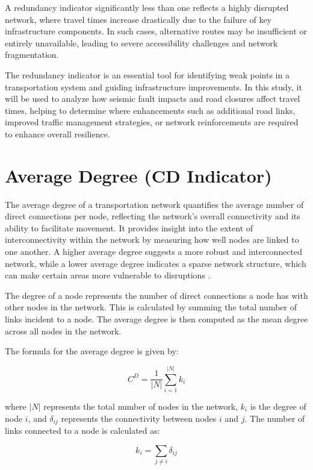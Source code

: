 A redundancy indicator significantly less than one reflects a highly disrupted network, where travel times increase drastically due to the failure of key infrastructure components. In such cases, alternative routes may be insufficient or entirely unavailable, leading to severe accessibility challenges and network fragmentation.

The redundancy indicator is an essential tool for identifying weak points in a transportation system and guiding infrastructure improvements. In this study, it will be used to analyze how seismic fault impacts and road closures affect travel times, helping to determine where enhancements such as additional road links, improved traffic management strategies, or network reinforcements are required to enhance overall resilience.

\section{Average Degree (CD Indicator)}
The average degree of a transportation network quantifies the average number of direct connections per node, reflecting the network’s overall connectivity and its ability to facilitate movement. It provides insight into the extent of interconnectivity within the network by measuring how well nodes are linked to one another. A higher average degree suggests a more robust and interconnected network, while a lower average degree indicates a sparse network structure, which can make certain areas more vulnerable to disruptions \cite{taylor2017}.

The degree of a node represents the number of direct connections a node has with other nodes in the network. This is calculated by summing the total number of links incident to a node. The average degree is then computed as the mean degree across all nodes in the network.

The formula for the average degree is given by:

\begin{equation}
C^D = \frac{1}{|N|} \sum_{i=1}^{|N|} k_i
\end{equation}

where \( |N| \) represents the total number of nodes in the network, \( k_i \) is the degree of node \( i \), and \( \delta_{ij} \) represents the connectivity between nodes \( i \) and \( j \). The number of links connected to a node is calculated as:

\begin{equation}
k_i = \sum_{j \neq i} \delta_{ij}
\end{equation}

